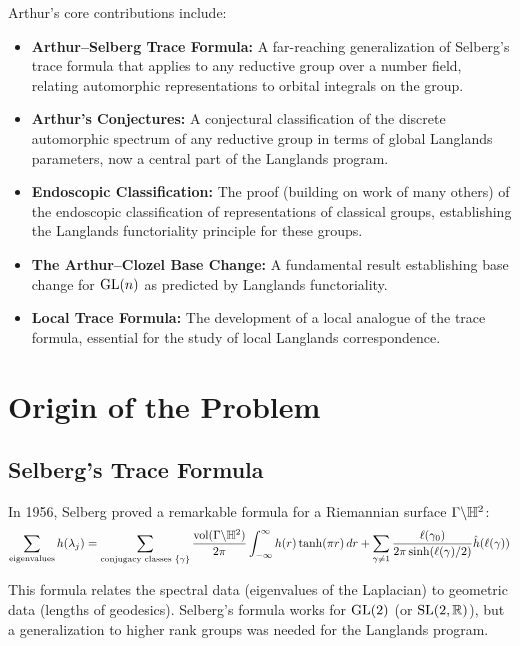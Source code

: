 Arthur's core contributions include:
\begin{itemize}
    \item \textbf{Arthur--Selberg Trace Formula:} A far-reaching generalization of Selberg's trace formula that applies to any reductive group over a number field, relating automorphic representations to orbital integrals on the group.
    \item \textbf{Arthur's Conjectures:} A conjectural classification of the discrete automorphic spectrum of any reductive group in terms of global Langlands parameters, now a central part of the Langlands program.
    \item \textbf{Endoscopic Classification:} The proof (building on work of many others) of the endoscopic classification of representations of classical groups, establishing the Langlands functoriality principle for these groups.
    \item \textbf{The Arthur--Clozel Base Change:} A fundamental result establishing base change for $\operatorname{GL}(n)$ as predicted by Langlands functoriality.
    \item \textbf{Local Trace Formula:} The development of a local analogue of the trace formula, essential for the study of local Langlands correspondence.
\end{itemize}

\section{Origin of the Problem}

\subsection{Selberg's Trace Formula}

In 1956, Selberg proved a remarkable formula for a Riemannian surface $\Gamma \backslash \mathbb{H}^2$:
\[
\sum_{\text{eigenvalues}} h(\lambda_j) = \sum_{\text{conjugacy classes } \{\gamma\}} \frac{\operatorname{vol}(\Gamma \backslash \mathbb{H}^2)}{2\pi} \int_{-\infty}^{\infty} h(r) \tanh(\pi r) \, dr + \sum_{\gamma \neq 1} \frac{\ell(\gamma_0)}{2\pi \sinh(\ell(\gamma)/2)} \hat{h}(\ell(\gamma))
\]

This formula relates the spectral data (eigenvalues of the Laplacian) to geometric data (lengths of geodesics). Selberg's formula works for $\operatorname{GL}(2)$ (or $\operatorname{SL}(2,\mathbb{R})$), but a generalization to higher rank groups was needed for the Langlands program.

